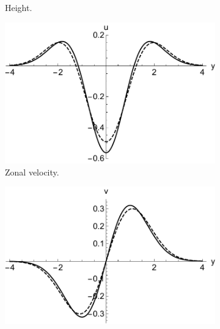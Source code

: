 \begin{figure}
\begin{subfigure}[b]{0.32\textwidth}
    \caption{Height.}
    \label{fig:free-h-shear-kelvin}
  \end{subfigure}
  \caption{The meridional structure of the free Kelvin mode, with and without a background shear flow \citep{hammond2018wavemean}. The flow introduces a non-zero meridional velocity.}
  \label{fig:free-shear-meridional-kelvin}

\vspace*{1.2cm}

%


  \begin{subfigure}[b]{0.32\textwidth}
    \includegraphics[width=\textwidth]{figures/wave-mean-flow/free-u-shear.pdf}
    \caption{Zonal velocity.}
    \label{fig:free-u-shear}
  \end{subfigure}
  \begin{subfigure}[b]{0.32\textwidth}
    \includegraphics[width=\textwidth]{figures/wave-mean-flow/free-v-shear.pdf}

\end{subfigure}
\end{figure}
